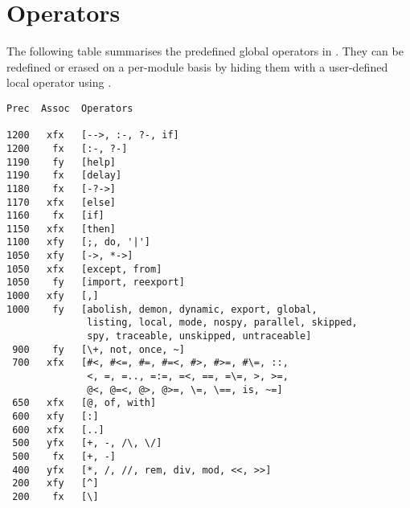 %
% 
% 
% 
% 
%
%
%
%
%
%
%

\chapter{Operators}
\label{chapopers}

%
%

The following table summarises the predefined global operators in {\eclipse}.
They can be redefined or erased on a per-module basis by hiding them
with a user-defined local operator using
.
\begin{verbatim}
Prec  Assoc  Operators

1200   xfx   [-->, :-, ?-, if]
1200    fx   [:-, ?-]
1190    fy   [help]
1190    fx   [delay]
1180    fx   [-?->]
1170   xfx   [else]
1160    fx   [if]
1150   xfx   [then]
1100   xfy   [;, do, '|']
1050   xfy   [->, *->]
1050   xfx   [except, from]
1050    fy   [import, reexport]
1000   xfy   [,]
1000    fy   [abolish, demon, dynamic, export, global, 
              listing, local, mode, nospy, parallel, skipped, 
              spy, traceable, unskipped, untraceable]
 900    fy   [\+, not, once, ~]
 700   xfx   [#<, #<=, #=, #=<, #>, #>=, #\=, ::, 
              <, =, =.., =:=, =<, ==, =\=, >, >=, 
              @<, @=<, @>, @>=, \=, \==, is, ~=]
 650   xfx   [@, of, with]
 600   xfy   [:]
 600   xfx   [..]
 500   yfx   [+, -, /\, \/]
 500    fx   [+, -]
 400   yfx   [*, /, //, rem, div, mod, <<, >>]
 200   xfy   [^]
 200    fx   [\]
\end{verbatim}

